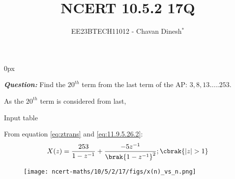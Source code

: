 \documentclass[journal,12pt,twocolumn]{IEEEtran}
\theoremstyle{remark}
\begin{document}
\parindent 0px

\vspace{3cm}

\title{NCERT 10.5.2 17Q}
\author{EE23BTECH11012 - Chavan Dinesh$^{*}$%
}
\maketitle
\newpage
\bigskip

\renewcommand{\thefigure}{\arabic{figure}}
\renewcommand{\thetable}{\arabic{table}}
\large\textbf{\textsl{Question:}}
Find the $20^{th}$ term from the last term of the AP: $3,8,13.....253$.

\solution
\fi
As the $20^{th}$ term is considered from last, 

\begin{table}[htbp]
    \centering
    
    \caption{Input table}
    \label{tab:parameter_table.10.5.2.17}
\end{table}

From equation \eqref{eq:ztrans} and \eqref{eq:11.9.5.26.2}:
\begin{align}
 X(z) =\frac{253}{1-z^{-1}}+ \frac{-5z^{-1}}{\brak{1-z^{-1}}^2};\cbrak{|z|>1}
\end{align}

\begin{figure}[ht]
    \centering
    \texttt{[image: ncert-maths/10/5/2/17/figs/x(n)\_vs\_n.png]}
    \caption{}
    \label{fig:graph1.10.5.2.17}
\end{figure}


\end{document}
